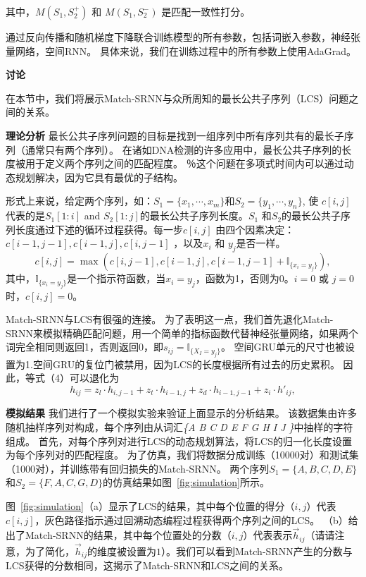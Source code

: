 其中，$M(S_1,S_2^+)$ 和 $M(S_1,S_2^-)$ 是匹配一致性打分。

通过反向传播和随机梯度下降联合训练模型的所有参数，包括词嵌入参数，神经张量网络，空间RNN。 具体来说，我们在训练过程中的所有参数上使用AdaGrad。

\textbf{讨论}

在本节中，我们将展示Match-SRNN与众所周知的最长公共子序列（LCS）问题之间的关系。

\textbf{理论分析}
最长公共子序列问题的目标是找到一组序列中所有序列共有的最长子序列（通常只有两个序列）。 在诸如DNA检测的许多应用中，最长公共子序列的长度被用于定义两个序列之间的匹配程度。 ％这个问题在多项式时间内可以通过动态规划解决，因为它具有最优的子结构。

形式上来说，给定两个序列，如：$S_1{=}\{x_1,\cdots,x_m\}$和$S_2{=}\{y_1,\cdots,y_n\}$, 使 $c[i,j]$ 代表的是$S_1[1{:}i]$ and $S_2[1{:}j]$的最长公共子序列长度。$S_1$ 和$S_2$的最长公共子序列长度通过下述的循环过程获得。每一步$c[i,j]$ 由四个因素决定： $c[i{-}1,j{-}1],c[i{-}1,j],c[i,j{-}1]$ ，以及$x_i$ 和 $y_j$是否一样。
\begin{equation}\label{eq:LCS}
c[i,j]{=}\max(c[i,j{-}1], c[i{-}1,j],c[i{-}1,j{-}1]+\mathbb{I}_{\{x_i=y_j\}}),
\end{equation}
其中，$\mathbb{I}_{\{x_i=y_j\}}$是一个指示符函数，当$x_i=y_j$，函数为1，否则为0。$i{=}0$ 或 $j{=}0$时，$c[i,j]{=}0$。

Match-SRNN与LCS有很强的连接。 为了表明这一点，我们首先退化Match-SRNN来模拟精确匹配问题，用一个简单的指标函数代替神经张量网络，如果两个词完全相同则返回1，否则返回0，即$ s_ {ij} {=}\mathbb{I}_ {\{X_I= y_j\}}$。
空间GRU单元的尺寸也被设置为1.空间GRU的复位门被禁用，因为LCS的长度根据所有过去的历史累积。 因此，等式（4）可以退化为
\[
{h}_{ij}     ={z}_{l}\cdot{h}_{i,j-1}+{z}_{t}\cdot{h}_{i-1,j}+
            		  {z}_{d}\cdot{h}_{i-1,j-1}+{z}_{i}\cdot{h}'_{ij},
\]

\textbf{模拟结果}
我们进行了一个模拟实验来验证上面显示的分析结果。 该数据集由许多随机抽样序列对构成，每个序列由从词汇\textit {\{A B C D E F G H I J \}}中抽样的字符组成。 首先，对每个序列对进行LCS的动态规划算法，将LCS的归一化长度设置为每个序列对的匹配程度。 为了仿真，我们将数据分成训练（10000对）和测试集（1000对），并训练带有回归损失的Match-SRNN。 两个序列$ S_1 = \{A, B, C, D, E \} $和$ S_2 = \{F, A, C, G, D \} $的仿真结果如图~\ref{fig:simulation}所示。

图~\ref{fig:simulation}（a）显示了LCS的结果，其中每个位置的得分$（i, j）$代表$ c [i, j] $，灰色路径指示通过回溯动态编程过程获得两个序列之间的LCS。 （b）给出了Match-SRNN的结果，其中每个位置处的分数$（i, j）$代表表示$ \vec {h} _ {ij} $（请请注意，为了简化，$ \vec {h} _ {ij} $的维度被设置为$ 1 $）。我们可以看到Match-SRNN产生的分数与LCS获得的分数相同，这揭示了Match-SRNN和LCS之间的关系。


